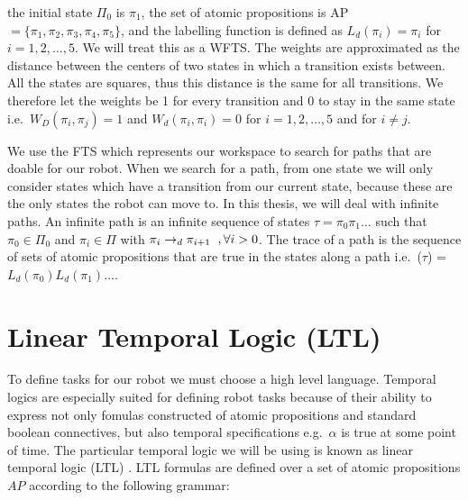 the initial state $\Pi_0$ is $\pi_1$, the set of atomic propositions is AP $=\{\pi_1,\pi_2,\pi_3,\pi_4,\pi_5\}$, and the labelling function is defined as $L_d(\pi_i) = \pi_i$ for $i=1,2,\dots,5$. We will treat this as a WFTS. The weights are approximated as the distance between the centers of two states in which a transition exists between. All the states are squares, thus this distance is the same for all transitions. We therefore let the weights be 1 for every transition and 0 to stay in the same state i.e.\ $W_D(\pi_i, \pi_j) = 1$ and $W_d(\pi_i,\pi_i)=0$ for $i=1,2,\dots,5$ and for $i \neq j$.


We use the FTS which represents our workspace to search for paths that are doable for our robot. When we search for a path, from one state we will only consider states which have a transition from our current state, because these are the only states the robot can move to.  In this thesis, we will deal with infinite paths. An infinite path is an infinite sequence of states $\tau = \pi_0 \pi_1 \dots$ such that $\pi_0 \in \Pi_0$ and $\pi_i \in \Pi$ with $\pi_{i} \rightarrow_d \pi_{i+1} \hspace{0.2cm}, \forall i > 0$. The trace of a path is the sequence of sets of atomic propositions that are true in the states along a path i.e.\ \trace($\tau$) = $L_d(\pi_0) L_d(\pi_1) \dots$.   %


\section{Linear Temporal Logic (LTL)}
To define tasks for our robot we must choose a high level language. Temporal logics are especially suited for defining robot tasks because of their ability to express not only fomulas constructed of atomic propositions and standard boolean connectives, but also temporal specifications e.g.\ $\alpha$ is true at some point of time. The particular temporal logic we will be using is known as linear temporal logic (LTL) \cite{clarke99}. LTL formulas are defined over a set of atomic propositions $AP$ according to the following grammar: %

